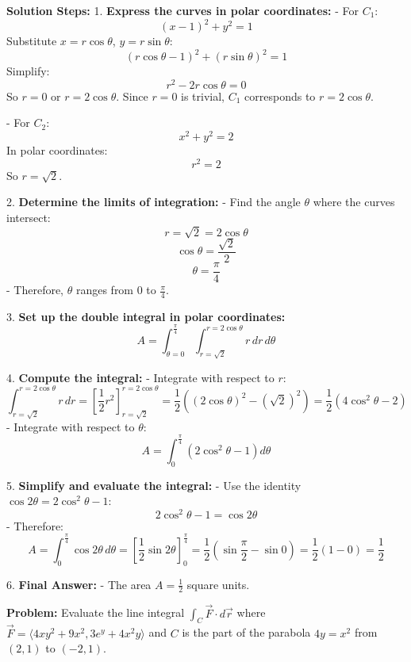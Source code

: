 \documentclass[9pt]{article}
\begin{document}
\begin{multicols}{2}
\begin{tcolorbox}[title=\textbf{Example: Computing Area Between Circles}, colframe=lightpink]
    \textbf{Solution Steps:}
    1. \textbf{Express the curves in polar coordinates:}
       - For \( C_1 \):
         \[ (x - 1)^2 + y^2 = 1 \]
         Substitute \( x = r \cos \theta \), \( y = r \sin \theta \):
         \[ (r \cos \theta - 1)^2 + (r \sin \theta)^2 = 1 \]
         Simplify:
         \[ r^2 - 2 r \cos \theta = 0 \]
         So \( r = 0 \) or \( r = 2 \cos \theta \).
         Since \( r = 0 \) is trivial, \( C_1 \) corresponds to \( r = 2 \cos \theta \).
    
       - For \( C_2 \):
         \[ x^2 + y^2 = 2 \]
         In polar coordinates:
         \[ r^2 = 2 \]
         So \( r = \sqrt{2} \).
    
    2. \textbf{Determine the limits of integration:}
       - Find the angle \( \theta \) where the curves intersect:
         \[ r = \sqrt{2} = 2 \cos \theta \]
         \[ \cos \theta = \frac{\sqrt{2}}{2} \]
         \[ \theta = \frac{\pi}{4} \]
       - Therefore, \( \theta \) ranges from \( 0 \) to \( \frac{\pi}{4} \).
    
    3. \textbf{Set up the double integral in polar coordinates:}
       \[ A = \int_{\theta = 0}^{\frac{\pi}{4}} \int_{r = \sqrt{2}}^{r = 2 \cos \theta} r \, dr \, d\theta \]
    
    4. \textbf{Compute the integral:}
       - Integrate with respect to \( r \):
         \[ \int_{r = \sqrt{2}}^{r = 2 \cos \theta} r \, dr = \left[ \frac{1}{2} r^2 \right]_{r = \sqrt{2}}^{r = 2 \cos \theta} = \frac{1}{2} \left( (2 \cos \theta)^2 - (\sqrt{2})^2 \right) = \frac{1}{2} \left( 4 \cos^2 \theta - 2 \right) \]
       - Integrate with respect to \( \theta \):
         \[ A = \int_{0}^{\frac{\pi}{4}} \left( 2 \cos^2 \theta - 1 \right) d\theta \]
    
    5. \textbf{Simplify and evaluate the integral:}
       - Use the identity \( \cos 2\theta = 2 \cos^2 \theta - 1 \):
         \[ 2 \cos^2 \theta - 1 = \cos 2\theta \]
       - Therefore:
         \[ A = \int_{0}^{\frac{\pi}{4}} \cos 2\theta \, d\theta = \left[ \frac{1}{2} \sin 2\theta \right]_{0}^{\frac{\pi}{4}} = \frac{1}{2} \left( \sin \frac{\pi}{2} - \sin 0 \right) = \frac{1}{2} (1 - 0) = \frac{1}{2} \]
    
    6. \textbf{Final Answer:}
       - The area \( A = \frac{1}{2} \) square units.
\end{tcolorbox} 


\begin{tcolorbox}[title=\textbf{Example: Evaluating a Line Integral}, colframe=lightpink]
    \textbf{Problem:} Evaluate the line integral \( \int_C \vec{F} \cdot d\vec{r} \) where \( \vec{F} = \langle 4xy^2 + 9x^2, 3e^y + 4x^2 y \rangle \) and \( C \) is the part of the parabola \( 4y = x^2 \) from \( (2, 1) \) to \( (-2, 1) \).
    

\end{tcolorbox}
\end{multicols}
\end{document}
